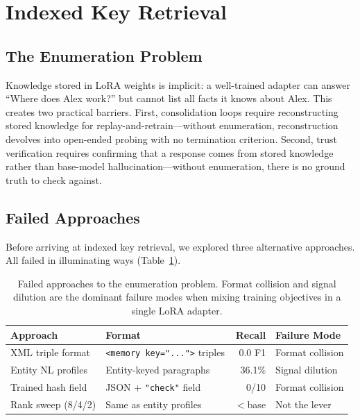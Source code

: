 \documentclass[11pt]{article}
\begin{document}
\section{Indexed Key Retrieval}
\label{sec:indexed}

\subsection{The Enumeration Problem}
\label{sec:enumeration}

Knowledge stored in LoRA weights is implicit: a well-trained adapter can answer ``Where does Alex work?'' but cannot list all facts it knows about Alex.
This creates two practical barriers.
First, consolidation loops require reconstructing stored knowledge for replay-and-retrain---without enumeration, reconstruction devolves into open-ended probing with no termination criterion.
Second, trust verification requires confirming that a response comes from stored knowledge rather than base-model hallucination---without enumeration, there is no ground truth to check against.

\subsection{Failed Approaches}
\label{sec:failed}

Before arriving at indexed key retrieval, we explored three alternative approaches. All failed in illuminating ways (Table~\ref{tab:failed}).

\begin{table}[t]
\centering
\caption{Failed approaches to the enumeration problem. Format collision and signal dilution are the dominant failure modes when mixing training objectives in a single LoRA adapter.}
\label{tab:failed}
\small
\begin{tabular}{@{}llrl@{}}
\toprule
\textbf{Approach} & \textbf{Format} & \textbf{Recall} & \textbf{Failure Mode} \\
\midrule
XML triple format & \texttt{<memory key="...">} triples & 0.0 F1 & Format collision \\
Entity NL profiles & Entity-keyed paragraphs & 36.1\% & Signal dilution \\
Trained hash field & JSON + \texttt{"check"} field & 0/10 & Format collision \\
Rank sweep (8/4/2) & Same as entity profiles & $<$base & Not the lever \\
\bottomrule
\end{tabular}
\end{table}
\end{document}
